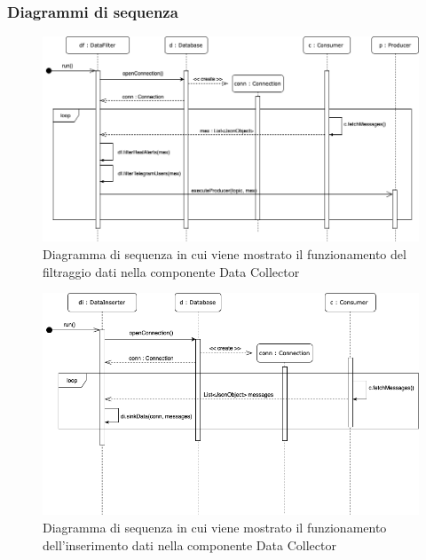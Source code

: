 	\begin{landscape}
	\subsubsection{Diagrammi di sequenza}
		\begin{figure}[H]
			\centering
			\includegraphics[scale=0.550]{res/images/DATACOLLECTOR/DataFilter.ThreadsKafkaDataCollector.png}
			\caption{Diagramma di sequenza in cui viene mostrato il funzionamento del filtraggio dati nella componente Data Collector}
		\end{figure}
		\begin{figure}[H]
			\centering
			\includegraphics[scale=0.550]{res/images/DATACOLLECTOR/DataInserter.ThreadsKafkaDataCollector.png}
			\caption{Diagramma di sequenza in cui viene mostrato il funzionamento dell'inserimento dati nella componente Data Collector}
		\end{figure}
	\end{landscape}